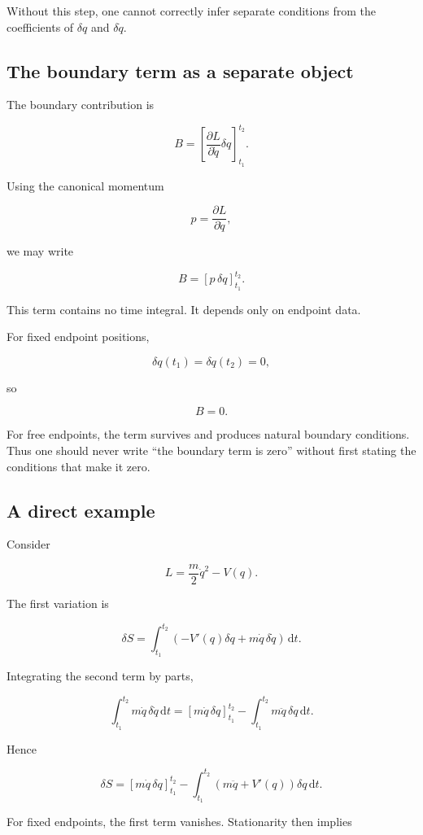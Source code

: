 Without this step, one cannot correctly infer separate conditions from the coefficients of \(\delta q\) and \(\delta\dot q\).

\subsection{The boundary term as a separate object}

The boundary contribution is

\[
B
=
\left[
\frac{\partial L}{\partial\dot q}
\delta q
\right]_{t_{1}}^{t_{2}}.
\]

Using the canonical momentum

\[
p
=
\frac{\partial L}{\partial\dot q},
\]

we may write

\[
B=[p\,\delta q]_{t_{1}}^{t_{2}}.
\]

This term contains no time integral. It depends only on endpoint data.

For fixed endpoint positions,

\[
\delta q(t_{1})=
\delta q(t_{2})=0,
\]

so

\[
B=0.
\]

For free endpoints, the term survives and produces natural boundary conditions. Thus one should never write ``the boundary term is zero'' without first stating the conditions that make it zero.

\subsection{A direct example}

Consider

\[
L
=
\frac{m}{2}\dot q^{2}-V(q).
\]

The first variation is

\[
\delta S
=
\int_{t_{1}}^{t_{2}}
\left(
-V'(q)\delta q
+
m\dot q\,\delta\dot q
\right)
\,\mathrm{d}t.
\]

Integrating the second term by parts,

\[
\int_{t_{1}}^{t_{2}}
m\dot q\,\delta\dot q
\,\mathrm{d}t
=
[m\dot q\,\delta q]_{t_{1}}^{t_{2}}
-
\int_{t_{1}}^{t_{2}}
m\ddot q\,\delta q
\,\mathrm{d}t.
\]

Hence

\[
\delta S
=
[m\dot q\,\delta q]_{t_{1}}^{t_{2}}
-
\int_{t_{1}}^{t_{2}}
\left(
m\ddot q+V'(q)
\right)
\delta q
\,\mathrm{d}t.
\]

For fixed endpoints, the first term vanishes. Stationarity then implies

